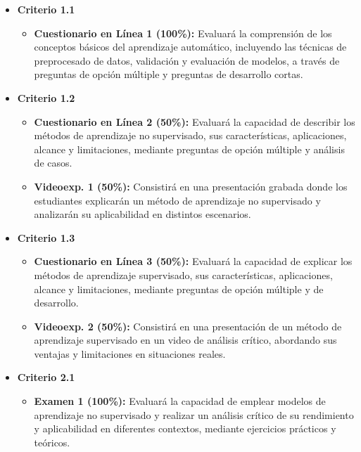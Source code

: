 \documentclass[a4,11pt]{aleph-notas}
\begin{document}
\begin{itemize}[leftmargin=*]
    \item \textbf{Criterio 1.1}
        \begin{itemize}[leftmargin=*]
            \item \textbf{Cuestionario en Línea 1 (100\%):} Evaluará la comprensión de los conceptos básicos del aprendizaje automático, incluyendo las técnicas de preprocesado de datos, validación y evaluación de modelos, a través de preguntas de opción múltiple y preguntas de desarrollo cortas.
        \end{itemize}
    \item \textbf{Criterio 1.2}
        \begin{itemize}[leftmargin=*]
            \item \textbf{Cuestionario en Línea 2 (50\%):} Evaluará la capacidad de describir los métodos de aprendizaje no supervisado, sus características, aplicaciones, alcance y limitaciones, mediante preguntas de opción múltiple y análisis de casos.
            \item \textbf{Videoexp. 1 (50\%):} Consistirá en una presentación grabada donde los estudiantes explicarán un método de aprendizaje no supervisado y analizarán su aplicabilidad en distintos escenarios.
        \end{itemize}
    \item \textbf{Criterio 1.3}
        \begin{itemize}[leftmargin=*]
            \item \textbf{Cuestionario en Línea 3 (50\%):} Evaluará la capacidad de explicar los métodos de aprendizaje supervisado, sus características, aplicaciones, alcance y limitaciones, mediante preguntas de opción múltiple y de desarrollo.
            \item \textbf{Videoexp. 2 (50\%):} Consistirá en una presentación de un método de aprendizaje supervisado en un video de análisis crítico, abordando sus ventajas y limitaciones en situaciones reales.
        \end{itemize}
    \item \textbf{Criterio 2.1}
        \begin{itemize}[leftmargin=*]
            \item \textbf{Examen 1 (100\%):} Evaluará la capacidad de emplear modelos de aprendizaje no supervisado y realizar un análisis crítico de su rendimiento y aplicabilidad en diferentes contextos, mediante ejercicios prácticos y teóricos.
        \end{itemize}

\end{itemize}
\end{document}
